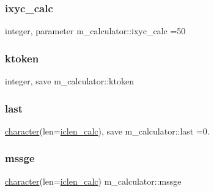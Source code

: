 \subsubsection{\texorpdfstring{ixyc\+\_\+calc}{ixyc\_calc}}
{\footnotesize\ttfamily integer, parameter m\+\_\+calculator\+::ixyc\+\_\+calc =50\hspace{0.3cm}{\ttfamily [private]}}

\mbox{\label{namespacem__calculator_ada86fed286e7bff1456862ab8b5bde47}} 
\subsubsection{\texorpdfstring{ktoken}{ktoken}}
{\footnotesize\ttfamily integer, save m\+\_\+calculator\+::ktoken\hspace{0.3cm}{\ttfamily [private]}}

\mbox{\label{namespacem__calculator_a5d0147576a419edafaabfc5d7f1317fc}} 
\subsubsection{\texorpdfstring{last}{last}}
{\footnotesize\ttfamily \hyperlink{option__stopwatch_83_8txt_abd4b21fbbd175834027b5224bfe97e66}{character}(len=\hyperlink{namespacem__calculator_accf705491e8bd9b3d2f0d04fd13712e7}{iclen\+\_\+calc}), save m\+\_\+calculator\+::last =\textquotesingle{}0.\textquotesingle{}\hspace{0.3cm}{\ttfamily [private]}}

\mbox{\label{namespacem__calculator_ac160bf2b4ddbb768c89d08f21e2ddbad}} 
\subsubsection{\texorpdfstring{mssge}{mssge}}
{\footnotesize\ttfamily \hyperlink{option__stopwatch_83_8txt_abd4b21fbbd175834027b5224bfe97e66}{character}(len=\hyperlink{namespacem__calculator_accf705491e8bd9b3d2f0d04fd13712e7}{iclen\+\_\+calc}) m\+\_\+calculator\+::mssge\hspace{0.3cm}{\ttfamily [private]}}

